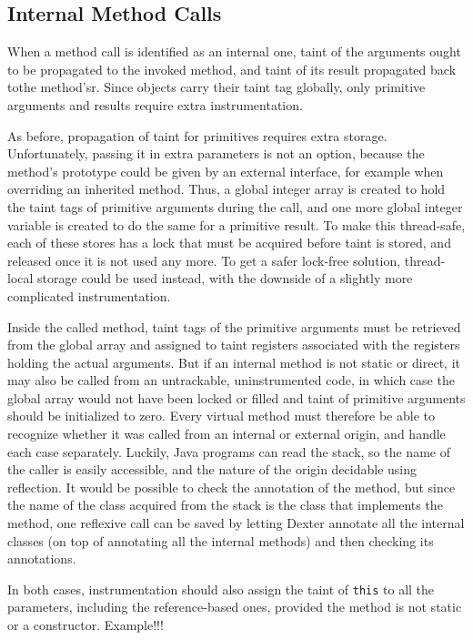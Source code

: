 \documentclass[12pt,twoside,notitlepage]{report}
\begin{document}
\subsection{Internal Method Calls}
\label{section:TaintPropagation_MethodCalls_Internal}

When a method call is identified as an internal one, taint of the arguments ought to be propagated to the invoked method, and taint of its result propagated back tothe method'sr. Since objects carry their taint tag globally, only primitive arguments and results require extra instrumentation. 

As before, propagation of taint for primitives requires extra storage. Unfortunately, passing it in extra parameters is not an option, because the method's prototype could be given by an external interface, for example when overriding an inherited method. Thus, a global integer array is created to hold the taint tags of primitive arguments during the call, and one more global integer variable is created to do the same for a primitive result. To make this thread-safe, each of these stores has a lock that must be acquired before taint is stored, and released once it is not used any more. To get a safer lock-free solution, thread-local storage could be used instead, with the downside of a slightly more complicated instrumentation.

Inside the called method, taint tags of the primitive arguments must be retrieved from the global array and assigned to taint registers associated with the registers holding the actual arguments. But if an internal method is not static or direct, it may also be called from an untrackable, uninstrumented code, in which case the global array would not have been locked or filled and taint of primitive arguments should be initialized to zero. Every virtual method must therefore be able to recognize whether it was called from an internal or external origin, and handle each case separately. Luckily, Java programs can read the stack, so the name of the caller is easily accessible, and the nature of the origin decidable using reflection. It would be possible to check the annotation of the method, but since the name of the class acquired from the stack is the class that implements the method, one reflexive call can be saved by letting Dexter annotate all the internal classes (on top of annotating all the internal methods) and then checking its annotations.

In both cases, instrumentation should also assign the taint of \verb$this$ to all the parameters, including the reference-based ones, provided the method is not static or a constructor. Example!!!
\end{document}
